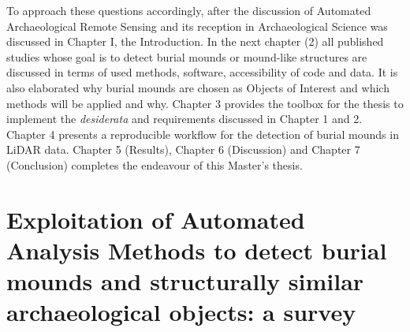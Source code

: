 \documentclass[
  12pt,
]{article}
\begin{document}
To approach these questions accordingly, after the discussion of Automated Archaeological Remote Sensing and its reception in Archaeological Science was discussed in Chapter I, the Introduction. In the next chapter (2) all published studies whose goal is to detect burial mounds or mound-like structures are discussed in terms of used methods, software, accessibility of code and data. It is also elaborated why burial mounds are chosen as Objects of Interest and which methods will be applied and why. Chapter 3 provides the toolbox for the thesis to implement the \emph{desiderata} and requirements discussed in Chapter 1 and 2. Chapter 4 presents a reproducible workflow for the detection of burial mounds in LiDAR data. Chapter 5 (Results), Chapter 6 (Discussion) and Chapter 7 (Conclusion) completes the endeavour of this Master's thesis.

\newpage

\vspace{5mm}
\justifying

\hypertarget{exploitation-of-automated-analysis-methods-to-detect-burial-mounds-and-structurally-similar-archaeological-objects-a-survey}{%
\section{Exploitation of Automated Analysis Methods to detect burial mounds and structurally similar archaeological objects: a survey}\label{exploitation-of-automated-analysis-methods-to-detect-burial-mounds-and-structurally-similar-archaeological-objects-a-survey}}
\end{document}

